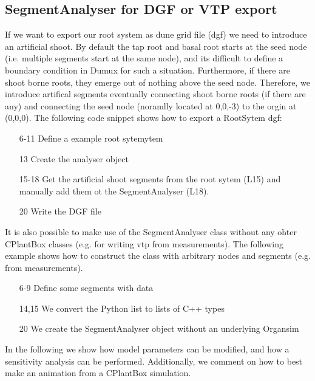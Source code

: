 \subsection{SegmentAnalyser for DGF or VTP export}

If we want to export our root system as dune grid file (dgf) we need to introduce an artificial shoot. By default the tap root and basal root starts at the seed node (i.e. multiple segments start at the same node), and its difficult to define a boundary condition in Dumux for such a situation. Furthermore, if there are shoot borne roots, they emerge out of nothing above the seed node. Therefore, we introduce artifical segments eventually connecting shoot borne roots (if there are any) and connecting the seed node (noramlly located at 0,0,-3) to the orgin at (0,0,0). The following code snippet shows how to export a RootSytem dgf:



\begin{itemize}
 \item[6-11] Define a example root sytemytem
 \item[13] Create the analyser object
 \item[15-18] Get the artificial shoot segments from the root sytem (L15) and manually add them ot the SegmentAnalyser (L18).
 \item[20] Write the DGF file 
\end{itemize}

It is also possible to make use of the SegmentAnalyser class without any ohter CPlantBox classes (e.g. for writing vtp from measurements). The following example shows how to construct the class with arbitrary nodes and segments (e.g. from measurements). 



\begin{itemize}
 \item[6-9] Define some segments with data
 \item[14,15] We convert the Python list to lists of C++ types
 \item[20] We create the SegmentAnalyser object without an underlying Organsim
\end{itemize}



In the following we show how model parameters can be modified, and how a sensitivity analysis can be performed. Additionally, we comment on how to best make an animation from a CPlantBox simulation.





